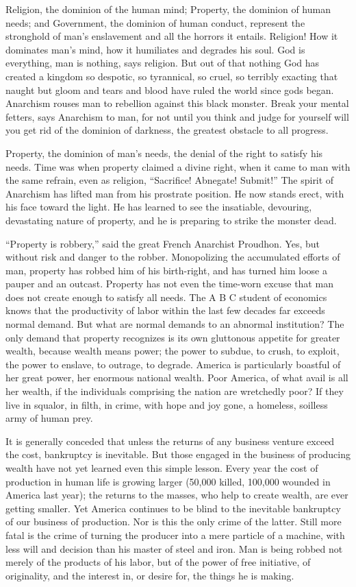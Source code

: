 Religion, the dominion of the human mind; Property, the dominion of
human needs; and Government, the dominion of human conduct, represent
the stronghold of man's enslavement and all the horrors it entails.
Religion! How it dominates man's mind, how it humiliates and degrades
his soul. God is everything, man is nothing, says religion. But out of
that nothing God has created a kingdom so des\-potic, so tyrannical,
so cruel, so terribly exacting that naught but gloom and tears and
blood have ruled the world since gods began. Anarchism rouses man to
rebellion against this black monster. Break your mental fetters, says
Anarchism to man, for not until you think and judge for yourself will
you get rid of the dominion of darkness, the greatest obstacle to all
progress.

Property, the dominion of man's needs, the denial of the right to
satisfy his needs. Time was when property claimed a divine right, when
it came to man with the same refrain, even as religion, ``Sacrifice!
Abnegate! Submit!'' The spirit of Anarchism has lifted man from his
prostrate position. He now stands erect, with his face toward the
light. He has learned to see the insatiable, devouring, devastating
nature of property, and he is preparing to strike the monster dead.

``Property is robbery,'' said the great French Anarchist Proudhon.
Yes, but without risk and danger to the robber. Monopolizing the
accumulated efforts of man, property has robbed him of his
birth-right, and has turned him loose a pauper and an
outcast. Property has not even the time-worn excuse that man does not
create enough to satisfy all needs. The A B C student of economics
knows that the productivity of labor within the last few decades far
exceeds normal demand. But what are normal demands to an abnormal
institution? The only demand that property recognizes is its own
gluttonous appetite for greater wealth, because wealth means power;
the power to subdue, to crush, to exploit, the power to enslave, to
outrage, to degrade. America is particularly boastful of her great
power, her enormous national wealth. Poor America, of what avail is
all her wealth, if the individuals comprising the nation are
wretchedly poor? If they live in squalor, in filth, in crime, with
hope and joy gone, a homeless, soilless army of human prey.

It is generally conceded that unless the returns of any business
venture exceed the cost, bankruptcy is inevitable. But those engaged
in the business of producing wealth have not yet learned even this
simple lesson. Every year the cost of production in human life is
growing larger (50,000 killed, 100,000 wounded in America last year);
the returns to the masses, who help to create wealth, are ever getting
smaller. Yet America continues to be blind to the inevitable
bankruptcy of our business of production. Nor is this the only crime
of the latter. Still more fatal is the crime of turning the producer
into a mere particle of a machine, with less will and decision than
his master of steel and iron. Man is being robbed not merely of the
products of his labor, but  of the power of free initiative,
of originality, and the interest in, or desire for, the things he is
making.

